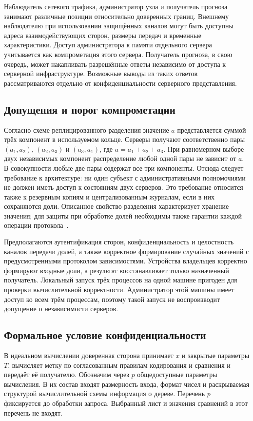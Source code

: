 Наблюдатель сетевого трафика, администратор узла и получатель прогноза
занимают различные позиции относительно доверенных границ. Внешнему
наблюдателю при использовании защищённых каналов могут быть доступны
адреса взаимодействующих сторон, размеры передач и временные
характеристики. Доступ администратора к памяти отдельного сервера
учитывается как компрометация этого сервера. Получатель прогноза,
в свою очередь, может накапливать разрешённые ответы независимо от
доступа к серверной инфраструктуре. Возможные выводы из таких ответов
рассматриваются отдельно от конфиденциальности серверного представления.

\subsection{Допущения и порог компрометации}

Согласно схеме реплицированного разделения значение $a$ представляется
суммой трёх компонент в используемом кольце. Серверы получают соответственно
пары $(a_1,a_2)$, $(a_2,a_3)$ и $(a_3,a_1)$, где
$a=a_1+a_2+a_3$. При равномерном выборе двух независимых компонент
распределение любой одной пары не зависит от $a$. В совокупности любые
две пары содержат все три компоненты. Отсюда следует требование к
архитектуре: ни один субъект с административными полномочиями не должен
иметь доступ к состояниям двух серверов. Это требование относится также
к резервным копиям и централизованным журналам, если в них сохраняются
доли. Описанное свойство разделения характеризует хранение значения;
для защиты при обработке долей необходимы также гарантии каждой операции
протокола~\cite{zapechnikov2022three,mohassel2018aby3}.

Предполагаются аутентификация сторон, конфиденциальность и целостность
каналов передачи долей, а также корректное формирование случайных значений
с предусмотренными протоколом зависимостями. Устройства владельцев
корректно формируют входные доли, а результат восстанавливает только
назначенный получатель. Локальный запуск трёх процессов на одной машине
пригоден для проверки вычислительной корректности. Администратор этой
машины имеет доступ ко всем трём процессам, поэтому такой запуск не
воспроизводит допущение о независимости серверов.

\subsection{Формальное условие конфиденциальности}

В идеальном вычислении доверенная сторона принимает $x$ и закрытые
параметры $T$, вычисляет метку по согласованным правилам кодирования
и сравнения и передаёт её получателю. Обозначим через $p$ общедоступные
параметры вычисления. В их состав входят размерность входа, формат
чисел и раскрываемая структурой вычислительной схемы информация о дереве.
Перечень $p$ фиксируется до обработки запроса. Выбранный лист и значения
сравнений в этот перечень не входят.

